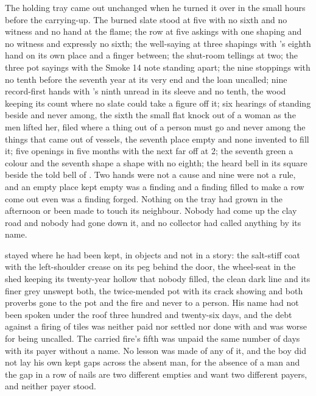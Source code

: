 The holding tray came out unchanged when he turned it over in the small hours before the carrying-up. The burned slate stood at five with no sixth and no witness and no hand at the flame; the row at five askings with one shaping and no witness and expressly no sixth; the well-saying at three shapings with 's eighth hand on its own place and a finger between; the shut-room tellings at two; the three pot sayings with the Smoke 14 note standing apart; the nine stoppings with no tenth before the seventh year at its very end and the loan uncalled; nine record-first hands with 's ninth unread in its sleeve and no tenth, the wood keeping its count where no slate could take a figure off it; six hearings of  standing beside and never among, the sixth the small flat knock out of a woman as the men lifted her, filed where a thing out of a person must go and never among the things that came out of vessels, the seventh place empty and none invented to fill it; five openings in five months with the next far off at  2; the seventh green a colour and the seventh shape a shape with no eighth; the heard bell in its square beside the told bell of . Two hands were not a cause and nine were not a rule, and an empty place kept empty was a finding and a finding filled to make a row come out even was a finding forged. Nothing on the tray had grown in the afternoon or been made to touch its neighbour. Nobody had come up the clay road and nobody had gone down it, and no collector had called anything by its name.

 stayed where he had been kept, in objects and not in a story: the salt-stiff coat with the left-shoulder crease on its peg behind the door, the wheel-seat in the shed keeping its twenty-year hollow that nobody filled, the clean dark line and its finer grey unswept both, the twice-mended pot with its crack showing and both proverbs gone to the pot and the fire and never to a person. His name had not been spoken under the roof three hundred and twenty-six days, and the debt against a firing of tiles was neither paid nor settled nor done with and was worse for being uncalled. The carried fire's fifth was unpaid the same number of days with its payer without a name. No lesson was made of any of it, and the boy did not lay his own kept gaps across the absent man, for the absence of a man and the gap in a row of nails are two different empties and want two different payers, and neither payer stood.

